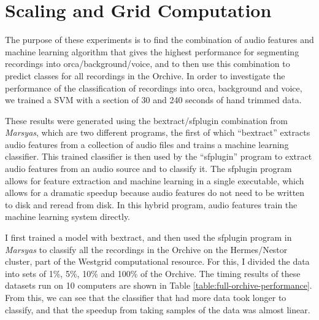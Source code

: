 \section{Scaling and Grid Computation}


The purpose of these experiments is to find the combination of audio
features and machine learning algorithm that gives the highest
performance for segmenting recordings into orca/background/voice, and
to then use this combination to predict classes for all recordings in
the Orchive.  In order to investigate the performance of the
classification of recordings into orca, background and voice, we
trained a SVM with a section of 30 and 240 seconds of hand trimmed
data.

These results were generated using the bextract/sfplugin combination
from \textit{Marsyas}, which are two different programs, the first of which
``bextract'' extracts audio features from a collection of audio files
and trains a machine learning classifier.  This trained classifier is
then used by the ``sfplugin'' program to extract audio features from
an audio source and to classify it.  The sfplugin program allows for
feature extraction and machine learning in a single executable, which
allows for a dramatic speedup because audio features do not need to be
written to disk and reread from disk.  In this hybrid program, audio
features train the machine learning system directly.

I first trained a model with bextract, and then used the sfplugin
program in \textit{Marsyas} to classify all the recordings in the Orchive on
the Hermes/Nestor cluster, part of the Westgrid computational
resource.  For this, I divided the data into sets of 1\%, 5\%, 10\%
and 100\% of the Orchive.  The timing results of these datasets run on
10 computers are shown in Table \ref{table:full-orchive-performance}.
From this, we can see that the classifier that had more data took
longer to classify, and that the speedup from taking samples of the
data was almost linear.


